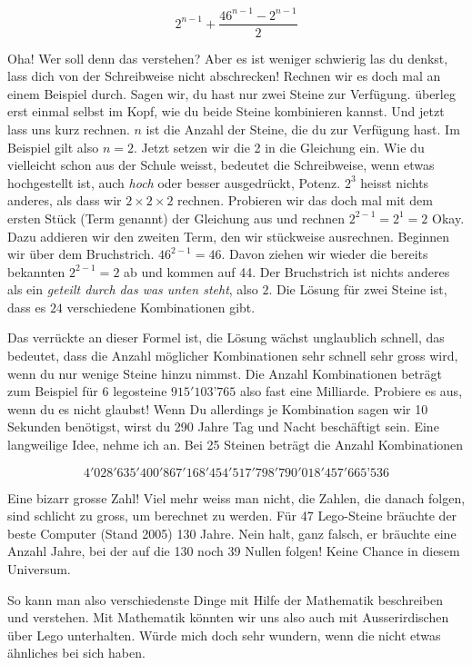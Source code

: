 $$2^{n-1}+\frac{46^{n-1}-2^{n-1}}{2}$$

Oha! Wer soll denn das verstehen? Aber es ist weniger schwierig las du denkst, lass dich von der Schreibweise nicht abschrecken! Rechnen wir es doch mal an einem Beispiel durch. Sagen wir, du hast nur zwei Steine zur Verfügung. überleg erst einmal selbst im Kopf, wie du beide Steine kombinieren kannst.
%
Und jetzt lass uns kurz rechnen. $n$ ist die Anzahl der Steine, die du zur Verfügung hast. Im Beispiel gilt also $n=2$. Jetzt setzen wir die 2 in die Gleichung ein. Wie du vielleicht schon aus der Schule weisst, bedeutet die Schreibweise, wenn etwas hochgestellt ist, auch \textit{hoch} oder besser ausgedrückt, Potenz. $2^3$ heisst nichts anderes, als dass wir $2\times2\times2$ rechnen. Probieren wir das doch mal mit dem ersten Stück (Term genannt) der Gleichung aus und rechnen $2^{2-1}=2^1=2$ Okay. Dazu addieren wir den zweiten Term, den wir stückweise ausrechnen. Beginnen wir über dem Bruchstrich. $46^{2-1}=46$. Davon ziehen wir wieder die bereits bekannten $2^{2-1}=2$ ab und kommen auf 44. Der Bruchstrich ist nichts anderes als ein \textit{geteilt durch das was unten steht}, also $2$. Die Lösung für zwei Steine ist, dass es $24$ verschiedene Kombinationen gibt.

% 
%
Das verrückte an dieser Formel ist, die Lösung wächst unglaublich schnell, das bedeutet, dass die Anzahl möglicher Kombinationen sehr schnell sehr gross wird, wenn du nur wenige Steine hinzu nimmst. Die Anzahl Kombinationen beträgt zum Beispiel für 6 legosteine $915'103’765$ also fast eine Milliarde. Probiere es aus, wenn du es nicht glaubst! Wenn Du allerdings je Kombination sagen wir 10 Sekunden benötigst, wirst du 290 Jahre Tag und Nacht beschäftigt sein. Eine langweilige Idee, nehme ich an. Bei 25 Steinen beträgt die Anzahl Kombinationen

\begin{footnotesize} 
$$4'028'635'400'867'168'454'517'798'790'018'457'665’536$$
\end{footnotesize} 
 
Eine bizarr grosse Zahl! Viel mehr weiss man nicht, die Zahlen, die danach folgen, sind schlicht zu gross, um berechnet zu werden. Für 47 Lego-Steine bräuchte der beste Computer (Stand 2005) 130 Jahre. Nein halt, ganz falsch, er bräuchte eine Anzahl Jahre, bei der auf die 130 noch 39 Nullen folgen! Keine Chance in diesem Universum.

So kann man also verschiedenste Dinge mit Hilfe der Mathematik beschreiben und verstehen. Mit Mathematik könnten wir uns also auch mit Ausserirdischen über Lego unterhalten. Würde mich doch sehr wundern, wenn die nicht etwas ähnliches bei sich haben.
 

